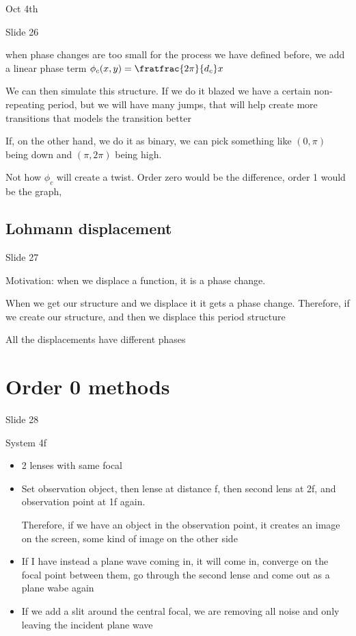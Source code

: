 \documentclass[../main/main.tex]{subfiles}
\begin{document}
Oct 4th


Slide 26

when phase changes are too small for the process we have defined before, we add a linear phase term $\phi_{c}(x,y) = \fratfrac{2\pi}{d_{c}}x$

We can then simulate this structure. If we do it blazed we have a certain non-repeating period, but we will have many jumps, that will help create more transitions that models the transition better

If, on the other hand, we do it as binary, we can pick something like $(0, \pi)$ being down and $(\pi, 2\pi)$ being high.

Not how $\phi_{c}$ will create a twist. Order zero would be the difference, order 1 would be the graph,


\subsection{Lohmann displacement}

Slide 27

Motivation: when we displace a function, it is a phase change.

When we get our structure and we displace it it gets a phase change. Therefore, if we create our structure, and then we displace this period structure

All the displacements have different phases


\section{Order 0 methods}

Slide 28

System 4f

\begin{itemize}
	\item 2 lenses with same focal
	\item Set observation object, then lense at distance f, then second lens at 2f, and observation point at 1f again.

	Therefore, if we have an object in the observation point, it creates an image on the screen, some kind of image on the other side
	\item If I have instead a plane wave coming in, it will come in, converge on the focal point between them, go through the second lense and come out as a plane wabe again
	\item If we add a slit around the central focal, we are removing all noise and only leaving the incident plane wave



\end{itemize}
\end{document}
